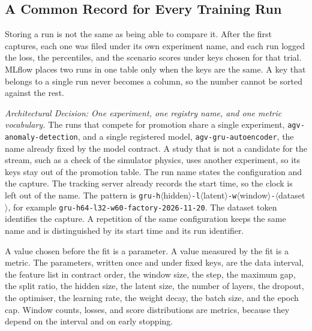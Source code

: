 \subsection{A Common Record for Every Training Run}
\label{subsec:arch_mlflow_record}

Storing a run is not the same as being able to compare it. After the first captures, each one was filed under its own experiment name, and each run logged the loss, the percentiles, and the scenario scores under keys chosen for that trial. MLflow places two runs in one table only when the keys are the same. A key that belongs to a single run never becomes a column, so the number cannot be sorted against the rest.

\textit{Architectural Decision: One experiment, one registry name, and one metric vocabulary.}
The runs that compete for promotion share a single experiment, \texttt{agv-anomaly-detection}, and a single registered model, \texttt{agv-gru-autoencoder}, the name already fixed by the model contract. A study that is not a candidate for the stream, such as a check of the simulator physics, uses another experiment, so its keys stay out of the promotion table. The run name states the configuration and the capture. The tracking server already records the start time, so the clock is left out of the name. The pattern is \texttt{gru-h}$\langle$hidden$\rangle$\texttt{-l}$\langle$latent$\rangle$\texttt{-w}$\langle$window$\rangle$\texttt{-}$\langle$dataset$\rangle$, for example \texttt{gru-h64-l32-w60-factory-2026-11-20}. The dataset token identifies the capture. A repetition of the same configuration keeps the same name and is distinguished by its start time and its run identifier.

A value chosen before the fit is a parameter. A value measured by the fit is a metric. The parameters, written once and under fixed keys, are the data interval, the feature list in contract order, the window size, the step, the maximum gap, the split ratio, the hidden size, the latent size, the number of layers, the dropout, the optimiser, the learning rate, the weight decay, the batch size, and the epoch cap. Window counts, losses, and score distributions are metrics, because they depend on the interval and on early stopping.

